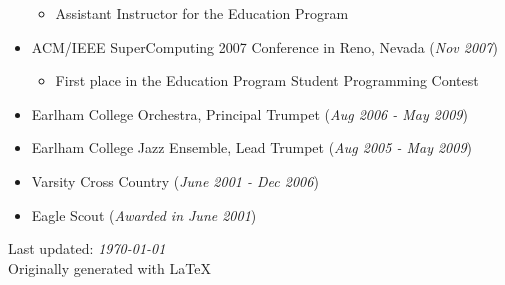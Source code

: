 \documentclass[10pt]{article}
\begin{document}
\begin{itemize}
		\vspace{-2mm}
		\begin{itemize}
			\item \indent Assistant Instructor for the Education Program
		\end{itemize}
		\vspace{-1mm}
  \item \indent ACM/IEEE SuperComputing 2007 Conference in Reno, Nevada (\emph{Nov 2007})
		\vspace{-2mm}
		\begin{itemize}
			\item \indent First place in the Education Program Student Programming Contest
		\end{itemize}
		\vspace{-1mm}
  \item \indent Earlham College Orchestra, Principal Trumpet (\emph{Aug 2006 - May 2009})
  \item \indent Earlham College Jazz Ensemble, Lead Trumpet (\emph{Aug 2005 - May 2009})
  \item \indent Varsity Cross Country (\emph{June 2001 - Dec 2006})
  \item \indent Eagle Scout (\emph{Awarded in June 2001})
\end{itemize}
\vfill
\begin{flushright}
Last updated: \emph{\today}
~\\
Originally generated with \LaTeX
\end{flushright}
\end{document}
